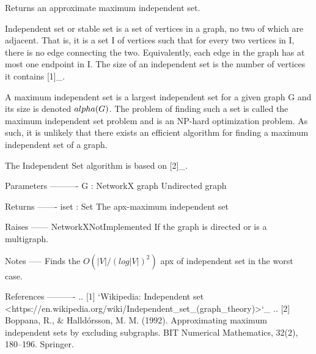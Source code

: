 \begin{DoxyVerb}Returns an approximate maximum independent set.

Independent set or stable set is a set of vertices in a graph, no two of
which are adjacent. That is, it is a set I of vertices such that for every
two vertices in I, there is no edge connecting the two. Equivalently, each
edge in the graph has at most one endpoint in I. The size of an independent
set is the number of vertices it contains [1]_.

A maximum independent set is a largest independent set for a given graph G
and its size is denoted $\\alpha(G)$. The problem of finding such a set is called
the maximum independent set problem and is an NP-hard optimization problem.
As such, it is unlikely that there exists an efficient algorithm for finding
a maximum independent set of a graph.

The Independent Set algorithm is based on [2]_.

Parameters
----------
G : NetworkX graph
    Undirected graph

Returns
-------
iset : Set
    The apx-maximum independent set

Raises
------
NetworkXNotImplemented
    If the graph is directed or is a multigraph.

Notes
-----
Finds the $O(|V|/(log|V|)^2)$ apx of independent set in the worst case.

References
----------
.. [1] `Wikipedia: Independent set
    <https://en.wikipedia.org/wiki/Independent_set_(graph_theory)>`_
.. [2] Boppana, R., & Halldórsson, M. M. (1992).
   Approximating maximum independent sets by excluding subgraphs.
   BIT Numerical Mathematics, 32(2), 180–196. Springer.
\end{DoxyVerb}
 